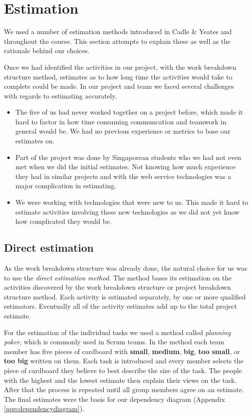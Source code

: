 \section{Estimation}
\label{sec:EmpiriEstimation}

We used a number of estimation methods introduced in Cadle \& Yeates\cite[ch.~9]{caye} and throughout the
course. This section attempts to explain these as well as the rationale behind our choices.

Once we had identified the activities in our project, with the work breakdown structure method,
estimates as to how long time the activities would take to complete could be made. In our project
and team we faced several challenges with regards to estimating accurately.

\begin{itemize}
\item The five of us had never worked together on a project before, which made it hard to factor
    in how time consuming communcation and teamwork in general would be. We had no previous experience
    or metrics to base our estimates on.
    
\item Part of the project was done by Singaporean students who we had not even met when we did the
    initial estimates. Not knowing how much experience they had in similar projects and with the web
    service technologies was a major complication in estimating.
    
\item We were working with technologies that were new to us. This made it hard to estimate activities
    involving these new technologies as we did not yet know how complicated they would be.
\end{itemize}

\subsection{Direct estimation}

As the work breakdown structure was already done, the natural choice for us was to use the \emph{direct
estimation method}\cite{caye}. The method bases its estimation on the activities discovered by the work
breakdown structure or project breakdown structure method. Each activity is  estimated separately, by
one or more qualified estimators. Eventually all of the activity estimates add up to the total project
estimate. 

For the estimation of the individual tasks we used a method called \emph{planning poker}, which is commonly
used in Scrum teams. In the method each team member has five pieces of cardboard with \textbf{small},
\textbf{medium}, \textbf{big}, \textbf{too small}, or \textbf{too big} written on them. Each task is
introduced and every member selects the piece of cardboard they believe to best describe the size of the task.
The people with the highest and the lowest estimate then explain their views on the task. After that the
process is repeated until all group members agree on an estimate. The final estimates were the basis for our
dependency diagram (Appendix \ref{app:dependencydiagram}).

